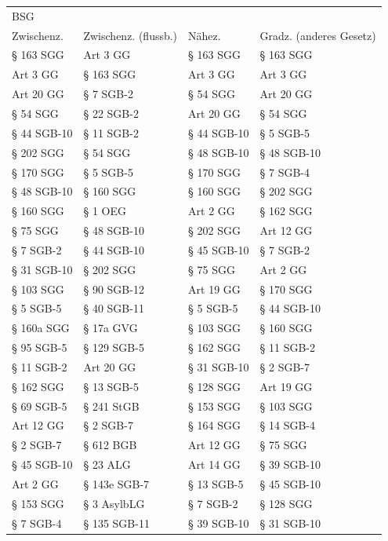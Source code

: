 \begin{tabular}{llll}
\toprule
\multicolumn{4}{l}{BSG} \\
 Zwischenz. & Zwischenz. (flussb.) &      Nähez. & Gradz. (anderes Gesetz) \\
\midrule
  § 163 SGG &             Art 3 GG &   § 163 SGG &               § 163 SGG \\
   Art 3 GG &            § 163 SGG &    Art 3 GG &                Art 3 GG \\
  Art 20 GG &            § 7 SGB-2 &    § 54 SGG &               Art 20 GG \\
   § 54 SGG &           § 22 SGB-2 &   Art 20 GG &                § 54 SGG \\
§ 44 SGB-10 &           § 11 SGB-2 & § 44 SGB-10 &               § 5 SGB-5 \\
  § 202 SGG &             § 54 SGG & § 48 SGB-10 &             § 48 SGB-10 \\
  § 170 SGG &            § 5 SGB-5 &   § 170 SGG &               § 7 SGB-4 \\
§ 48 SGB-10 &            § 160 SGG &   § 160 SGG &               § 202 SGG \\
  § 160 SGG &              § 1 OEG &    Art 2 GG &               § 162 SGG \\
   § 75 SGG &          § 48 SGB-10 &   § 202 SGG &               Art 12 GG \\
  § 7 SGB-2 &          § 44 SGB-10 & § 45 SGB-10 &               § 7 SGB-2 \\
§ 31 SGB-10 &            § 202 SGG &    § 75 SGG &                Art 2 GG \\
  § 103 SGG &          § 90 SGB-12 &   Art 19 GG &               § 170 SGG \\
  § 5 SGB-5 &          § 40 SGB-11 &   § 5 SGB-5 &             § 44 SGB-10 \\
 § 160a SGG &            § 17a GVG &   § 103 SGG &               § 160 SGG \\
 § 95 SGB-5 &          § 129 SGB-5 &   § 162 SGG &              § 11 SGB-2 \\
 § 11 SGB-2 &            Art 20 GG & § 31 SGB-10 &               § 2 SGB-7 \\
  § 162 SGG &           § 13 SGB-5 &   § 128 SGG &               Art 19 GG \\
 § 69 SGB-5 &           § 241 StGB &   § 153 SGG &               § 103 SGG \\
  Art 12 GG &            § 2 SGB-7 &   § 164 SGG &              § 14 SGB-4 \\
  § 2 SGB-7 &            § 612 BGB &   Art 12 GG &                § 75 SGG \\
§ 45 SGB-10 &             § 23 ALG &   Art 14 GG &             § 39 SGB-10 \\
   Art 2 GG &         § 143e SGB-7 &  § 13 SGB-5 &             § 45 SGB-10 \\
  § 153 SGG &          § 3 AsylbLG &   § 7 SGB-2 &               § 128 SGG \\
  § 7 SGB-4 &         § 135 SGB-11 & § 39 SGB-10 &             § 31 SGB-10 \\
\bottomrule
\end{tabular}


